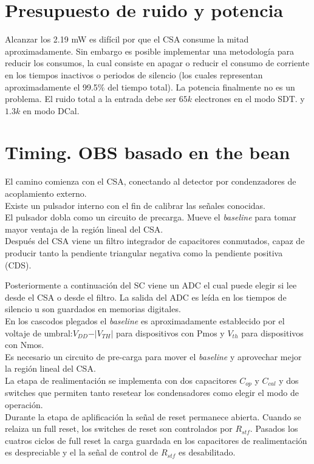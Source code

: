 \section{Presupuesto de ruido y potencia}
Alcanzar los 2.19 mW es difícil por que el CSA consume la mitad aproximadamente. Sin embargo es posible implementar una metodología para reducir los consumos, la cual consiste en apagar o reducir el consumo de corriente en los tiempos inactivos o periodos de silencio (los cuales representan aproximadamente el 99.5\% del tiempo total). La potencia finalmente no es un problema.
El ruido total a la entrada debe ser $65k$ electrones en el modo SDT. y $1.3k$ en modo DCal.
\section{Timing. OBS basado en the bean}
El camino comienza con el CSA, conectando al detector  por condenzadores de acoplamiento externo.\\
Existe un pulsador interno con el fin de calibrar las señales conocidas.\\
El pulsador dobla como un circuito de precarga. Mueve el \textit{baseline} para tomar mayor ventaja de la región lineal del CSA.\\
Después del CSA viene un filtro integrador de capacitores conmutados, capaz de producir tanto la pendiente triangular negativa como la pendiente positiva (CDS).

Posteriormente a continuación del SC viene un ADC el cual puede elegir si lee desde el CSA o desde el filtro. La salida del ADC es leída en los tiempos de silencio u son guardados en memorias digitales.\\
En los cascodos plegados el \textit{baseline} es aproximadamente establecido por el voltaje de umbral:$V_{DD}-\vert V_{TH}\vert$ para dispositivos con Pmos y $V_{th}$ para dispositivos con Nmos.\\
Es necesario un circuito de pre-carga para mover el \textit{baseline} y aprovechar mejor la región lineal del CSA.\\
La etapa de realimentación se implementa con dos capacitores $C_{op}$ y $C_{cal}$ y dos switches que permiten tanto resetear los condensadores como elegir el modo de operación.\\
Durante la etapa de aplificación la señal de reset permanece abierta. Cuando se relaiza un full reset, los switches de reset son controlados por $R_{stf}$. Pasados los cuatros ciclos de full reset la carga guardada en los capacitores de realimentación es despreciable y el la señal de control de $R_{stf}$ es desabilitado.
